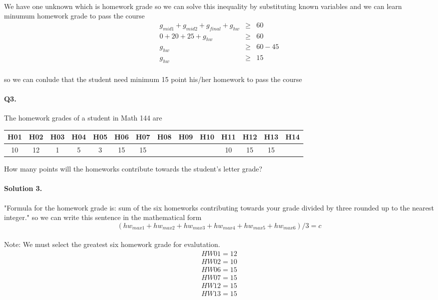 \documentclass[11pt]{article}
\begin{document}
\paragraph{}We have one unknown which is homework grade so we can solve this inequality by substituting known variables and we can learn minumum homework grade to pass the course
\begin{eqnarray*}
g_{mid1} +  g_{mid2} + g_{final} + g_{hw} &\geq & 60
\\0 + 20 + 25 + g_{hw} &\geq & 60
\\g_{hw} & \geq & 60-45
\\g_{hw} & \geq & 15
\end{eqnarray*}
\paragraph{}so we can conlude that the student need minimum 15 point his/her homework to pass the course

\paragraph{Q3.} The homework grades of a student in Math 144 are
\begin{center}
\begin{tabular}{*{14}{c}}
H01 & H02 & H03 & H04 & H05 & H06 & H07 & H08 & H09 
	& H10 & H11 & H12 & H13 & H14
\\\hline
10 & 12 & 1 & 5 & 3 & 15 & 15 & & & & 10 & 15 & 15
\end{tabular}
\end{center}
How many points will the homeworks contribute towards the student's letter
grade?

\paragraph{Solution 3.}"Formula for the homework grade is: sum of the six homeworks contributing towards your grade divided by three rounded up to the nearest integer." so we can write this sentence in the mathematical form
\begin{equation}
(hw_{max1} + hw_{max2} + hw_{max3} + hw_{max4} + hw_{max5} + hw_{max6})/3 = c
\end{equation}
\paragraph{}Note: We must select the greatest six homework grade for evalutation.
\begin{eqnarray*}
HW01=12
\\HW02=10
\\HW06=15
\\HW07=15
\\HW12=15
\\HW13=15
\end{eqnarray*}
\end{document}
